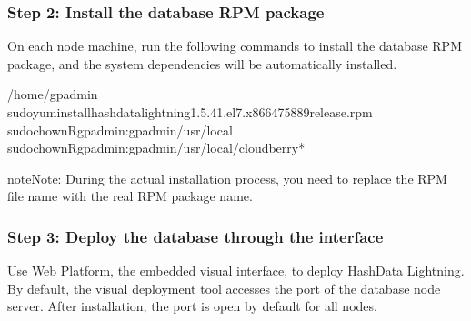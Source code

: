\documentclass[letterpaper,10pt,english]{sphinxmanual}
\begin{document}
\subsubsection{Step 2: Install the database RPM package}
\label{\detokenize{deploy-guides/physical-deploy/visualized-deploy:step-2-install-the-database-rpm-package}}
\sphinxAtStartPar
On each node machine, run the following commands to install the database RPM package, and the system dependencies will be automatically installed.

\begin{sphinxVerbatim}[commandchars=\\\{\}]
/home/gpadmin
sudoyuminstallhashdata\PYGZhy{}lightning\PYGZhy{}1.5.4\PYGZhy{}1.el7.x86\PYGZus{}64\PYGZhy{}75889\PYGZhy{}release.rpm
sudochown\PYGZhy{}Rgpadmin:gpadmin/usr/local
sudochown\PYGZhy{}Rgpadmin:gpadmin/usr/local/cloudberry*
\end{sphinxVerbatim}

\begin{sphinxadmonition}{note}{Note:}
\sphinxAtStartPar
During the actual installation process, you need to replace the RPM file name  with the real RPM package name.
\end{sphinxadmonition}


\subsubsection{Step 3: Deploy the database through the interface}
\label{\detokenize{deploy-guides/physical-deploy/visualized-deploy:step-3-deploy-the-database-through-the-interface}}
\sphinxAtStartPar
Use Web Platform, the embedded visual interface, to deploy HashData Lightning. By default, the visual deployment tool accesses the  port of the database node server. After installation, the  port is open by default for all nodes.
\end{document}
